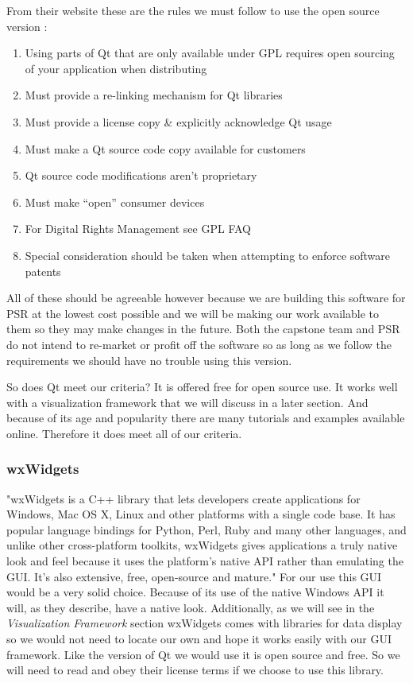 \documentclass[onecolumn, draftclsnofoot,10pt, compsoc]{IEEEtran}
\begin{document}
From their website these are the rules we must follow to use the open source version \cite{qt}:
\begin{enumerate}
    \item Using parts of Qt that are only available under GPL requires open sourcing of your application when distributing
    \item Must provide a re-linking mechanism for Qt libraries
    \item Must provide a license copy \& explicitly acknowledge Qt usage
    \item Must make a Qt source code copy available for customers
    \item Qt source code modifications aren’t proprietary
    \item Must make “open” consumer devices
    \item For Digital Rights Management see GPL FAQ
    \item Special consideration should be taken when attempting to enforce software patents
\end{enumerate}

All of these should be agreeable however because we are building this software for PSR at the lowest cost possible and we will be making our work available to them so they may make changes in the future. 
Both the capstone team and PSR do not intend to re-market or profit off the software so as long as we follow the requirements we should have no trouble using this version.

So does Qt meet our criteria? It is offered free for open source use. 
It works well with a visualization framework that we will discuss in a later section. 
And because of its age and popularity there are many tutorials and examples available online. 
Therefore it does meet all of our criteria.

\subsubsection{wxWidgets}
"wxWidgets is a C++ library that lets developers create applications for Windows, Mac OS X, Linux and other platforms with a single code base. It has popular language bindings for Python, Perl, Ruby and many other languages, and unlike other cross-platform toolkits, wxWidgets gives applications a truly native look and feel because it uses the platform's native API rather than emulating the GUI. It's also extensive, free, open-source and mature." \cite{wx}
For our use this GUI would be a very solid choice. 
Because of its use of the native Windows API it will, as they describe, have a native look.
Additionally, as we will see in the \textit{Visualization Framework} section wxWidgets comes with libraries for data display so we would not need to locate our own and hope it works easily with our GUI framework.
Like the version of Qt we would use it is open source and free. 
So we will need to read and obey their license terms if we choose to use this library.
\end{document}
